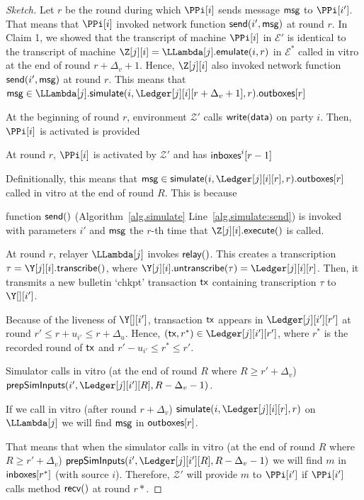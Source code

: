 \begin{proof}[Sketch]
  Let $r$ be the round during which $\PPi[i]$ sends message $\textsf{msg}$ to $\PPi[i']$.
  That means that $\PPi[i]$ invoked network function $\textsf{send}(i', \textsf{msg})$ at round $r$.
  In Claim 1, we showed that the transcript of machine $\PPi[i]$ in $\mathcal{E}'$
  is identical to the transcript of machine $\Z[j][i] = \LLambda[j].\emulateMachine(i,r)$ in $\mathcal{E}^*$
  called in vitro at the end of round $r + \Delta_v + 1$.
  Hence, $\Z[j][i]$ also invoked network function $\textsf{send}(i', \textsf{msg})$ at round $r$.
  This means that $\msg \in \LLambda[j].\simulate(i, \Ledger[j][i][r + \Delta_v + 1], r).\outboxes[r]$

  At the beginning of round $r$, environment $\mathcal{Z}'$
  calls $\textsf{write}(\textsf{data})$ on party $i$.
  Then, $\PPi[i]$ is activated
  is provided

  At round $r$, $\PPi[i]$ is activated by $\mathcal{Z}'$ and
  has $\textsf{inboxes}^i[r - 1]$

  Definitionally, this means that $\msg \in \simulate(i, \Ledger[j][i][r], r).\outboxes[r]$
  called in vitro at the end of round $R$. This is because

  function $\textsf{send}()$ (Algorithm~\ref{alg.simulate} Line~\ref{alg.simulate:send}) is invoked
  with parameters $i'$ and $\textsf{msg}$ the $r$-th time that $\Z[j][i].\execute()$ is called.

  At round $r$, relayer $\LLambda[j]$ invokes $\textsf{relay}()$.
  This creates a transcription $\tau = \Y[j][i].\transcribe()$, where
  $\Y[j][i].\untranscribe(\tau) = \Ledger[j][i][r]$.
  Then, it transmits a new bulletin `chkpt'
  transaction $\textsf{tx}$ containing transcription $\tau$ to $\Y[][i']$.

  Because of the liveness of $\Y[][i']$,
  transaction $\textsf{tx}$ appears in $\Ledger[j][i'][r']$
  at round $r' \leq r + u_{i'} \leq r + \Delta_u$.
  Hence, $(\tx, r^*) \in \Ledger[j][i'][r']$, where $r^*$ is the recorded round of $\textsf{tx}$ and $r' - u_{i'}\leq r^* \leq r'$.

  Simulator calls in vitro (at the end of round $R$ where
  $R \geq r' + \Delta_v$) $\prepareSimulationInputs(i', \Ledger[j][i'][R], R - \Delta_v - 1)$.

  If we call in vitro
  (after round $r + \Delta_v$) $\simulate(i, \Ledger[j][i][r], r)$
  on $\LLambda[j]$ we will find $\textsf{msg}$ in $\textsf{outboxes}[r]$.

  That means that when the simulator calls in vitro
  (at the end of round $R$ where $R \geq r' + \Delta_v$) $\prepareSimulationInputs(i', \Ledger[j][i'][R], R - \Delta_v - 1)$
  we will find $m$ in $\textsf{inboxes}[r^*]$ (with source $i$).
  Therefore, $\mathcal{Z}'$ will provide $m$ to $\PPi[i']$
  if $\PPi[i']$ calls method $\textsf{recv}()$ at round $r*$.


\end{proof}

